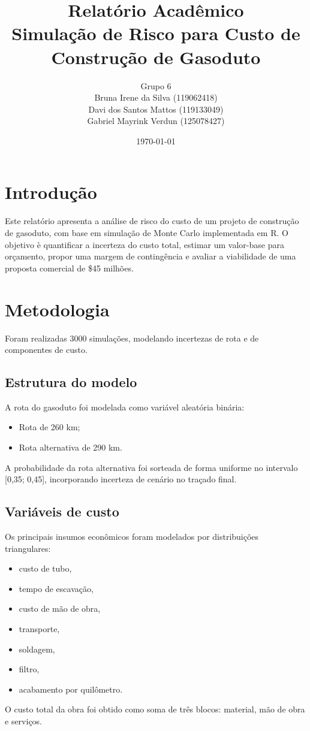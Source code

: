 \documentclass[12pt,a4paper]{article}
\title{Relat\'orio Acad\^emico\\Simula\c{c}\~ao de Risco para Custo de Constru\c{c}\~ao de Gasoduto}
\author{Grupo 6\\Bruna Irene da Silva (119062418)\\Davi dos Santos Mattos (119133049)\\Gabriel Mayrink Verdun (125078427)}
\date{\today}
\begin{document}
\maketitle

\section{Introdu\c{c}\~ao}
Este relat\'orio apresenta a an\'alise de risco do custo de um projeto de constru\c{c}\~ao de gasoduto, com base em simula\c{c}\~ao de Monte Carlo implementada em R. O objetivo \`e quantificar a incerteza do custo total, estimar um valor-base para or\c{c}amento, propor uma margem de conting\^encia e avaliar a viabilidade de uma proposta comercial de \$45 milh\~oes.

\section{Metodologia}
Foram realizadas 3000 simula\c{c}\~oes, modelando incertezas de rota e de componentes de custo.

\subsection{Estrutura do modelo}
A rota do gasoduto foi modelada como vari\'avel aleat\'oria bin\'aria:
\begin{itemize}
  \item Rota de 260 km;
  \item Rota alternativa de 290 km.
\end{itemize}
A probabilidade da rota alternativa foi sorteada de forma uniforme no intervalo [0,35; 0,45], incorporando incerteza de cen\'ario no tra\c{c}ado final.

\subsection{Vari\'aveis de custo}
Os principais insumos econ\^omicos foram modelados por distribui\c{c}\~oes triangulares:
\begin{itemize}
  \item custo de tubo,
  \item tempo de escava\c{c}\~ao,
  \item custo de m\~ao de obra,
  \item transporte,
  \item soldagem,
  \item filtro,
  \item acabamento por quil\^ometro.
\end{itemize}
O custo total da obra foi obtido como soma de tr\^es blocos: material, m\~ao de obra e servi\c{c}os.
\end{document}
